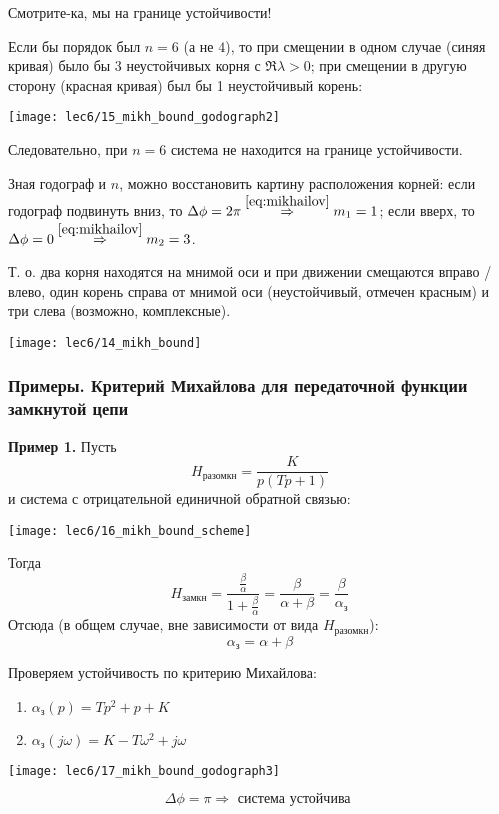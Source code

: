 \documentclass[main.tex]{subfiles}
\begin{document}
Смотрите-ка, мы на границе устойчивости!

Если бы порядок был $ n = 6 $ (а не $4$), то при смещении в одном случае (синяя кривая) было бы 3 неустойчивых корня с $\Re \lambda > 0$; при смещении в другую сторону (красная кривая) был бы 1 неустойчивый корень:

\texttt{[image: lec6/15\_mikh\_bound\_godograph2]}

Следовательно, при $ n = 6 $ система не находится на границе устойчивости.

Зная годограф и $n$, можно восстановить картину расположения корней:
если годограф подвинуть вниз, то $ \Delta \phi = 2 \pi \overset{\eqref{eq:mikhailov}}\Rightarrow m_1 = 1  $; если вверх, то $ \Delta \phi = 0 \overset{\eqref{eq:mikhailov}}\Rightarrow m_2 = 3  $.

Т. о. два корня находятся на мнимой оси и при движении смещаются вправо / влево, один корень справа от мнимой оси (неустойчивый, отмечен красным) и три слева (возможно, комплексные).

\texttt{[image: lec6/14\_mikh\_bound]}

\subsubsection{Примеры. Критерий Михайлова для передаточной функции замкнутой цепи}

\textbf{Пример 1.} Пусть
$$ H_{\text{разомкн}} = \frac{K}{p(Tp + 1)} $$
и система с отрицательной единичной обратной связью:

\texttt{[image: lec6/16\_mikh\_bound\_scheme]}

Тогда
$$ H_{\text{замкн}} = \frac{\frac{\beta}{\alpha}}{1 + \frac{\beta}{\alpha}} = \frac{\beta}{\alpha + \beta} = \frac{\beta}{\alpha_{\text{з}}} $$
Отсюда (в общем случае, вне зависимости от вида $ H_{\text{разомкн}} $):
$$ \boxed{ \alpha_{\text{з}} = \alpha + \beta } $$

Проверяем устойчивость по критерию Михайлова:
\begin{enumerate}[noitemsep]
    \item $ \alpha_{\text{з}}(p) = Tp^2 + p + K $
    \item $ \alpha_{\text{з}}(j \omega) = K - T \omega^2 + j \omega $
\end{enumerate}

\texttt{[image: lec6/17\_mikh\_bound\_godograph3]}

$$ \Delta \phi = \pi \Rightarrow \text{ система устойчива } $$
\end{document}
